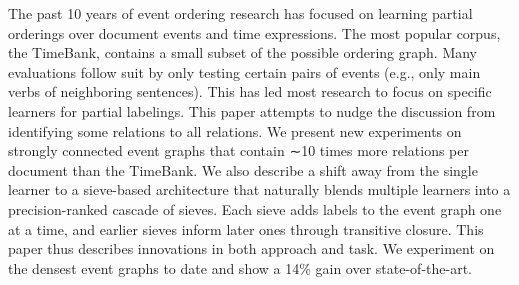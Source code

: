 The past 10 years of event ordering research has focused on learning partial orderings over document events and time expressions. The most popular corpus, the TimeBank, contains a small subset of the possible ordering graph. Many evaluations follow suit by only testing certain pairs of events (e.g., only main verbs of neighboring sentences). This has led most research to focus on specific learners for partial labelings. This paper attempts to nudge the discussion from identifying some relations to all relations. We present new experiments on strongly connected event graphs that contain ∼10 times more relations per document than the TimeBank. We also describe a shift away from the single learner to a sieve-based architecture that naturally blends multiple learners into a precision-ranked cascade of sieves. Each sieve adds labels to the event graph one at a time, and earlier sieves inform later ones through transitive closure. This paper thus describes innovations in both approach and task. We experiment on the densest event graphs to date and show a 14\% gain over state-of-the-art.